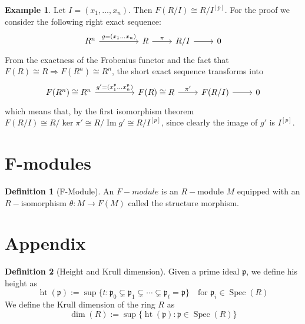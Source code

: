 \documentclass[leqno]{article}
\theoremstyle{definition}
\newtheorem{definition}{Definition}[section]
\newtheorem{example}{Example}[section]
\DeclareMathOperator{\im}{Im}
\DeclareMathOperator{\heigth}{ht}
\DeclareMathOperator{\Spec}{Spec}
\begin{document}
\begin{example} Let $I = (x_1, \ldots, x_n)$. Then $F(R / I) \cong R / I ^{[p]}$. For the proof we consider the following right exact sequence:
\[\begin{tikzcd}
	{R^n} && R & {R/I} & 0
	\arrow["\pi", from=1-3, to=1-4]
	\arrow[from=1-4, to=1-5]
	\arrow["{g = (x_1 \ldots x_n)}", from=1-1, to=1-3]
\end{tikzcd}\]
 From the exactness of the Frobenius functor and the fact that $F(R)\cong R \Rightarrow F(R^n)\cong R^n$, the short exact sequence transforms into
\[\begin{tikzcd}
	{F(R^n)\cong R^n} && {F(R)\cong R} & {F(R/I)} & 0
	\arrow["{\pi'}", from=1-3, to=1-4]
	\arrow[from=1-4, to=1-5]
	\arrow["{g' = (x_1^p \ldots x_n^p)}", from=1-1, to=1-3]
\end{tikzcd}\]
which means that, by the first isomorphism theorem $F(R / I) \cong R / \ker \pi' \cong R / \im g' \cong R / I^{[p]} $, since clearly the image of $g'$ is  $I ^{[p]}$.
\end{example}




\section{F-modules}

\begin{definition}[F-Module] An $F-module$ is an $R-$module $M$ equipped with an $R-$isomorphism  $\theta:M \to F(M)$ called the structure morphism.
\end{definition}



\section{Appendix}

\begin{definition}[Height and Krull dimension] Given a prime ideal $\mathfrak{p}$, we define his height as
  \[
	\heigth (\mathfrak{p}) := \sup \{t: \mathfrak{p}_0 \subsetneq \mathfrak{p}_1 \subsetneq \cdots \subsetneq  \mathfrak{p}_t = \mathfrak{p} \} \quad \text{for } \mathfrak{p}_i\in \Spec(R)
  \]
We define the Krull dimension of the ring $R$ as
 \[
 \dim (R) :=  \sup \{\heigth (\mathfrak{p}) : \mathfrak{p}\in \Spec(R)\}
\] 
\end{definition}
\end{document}
